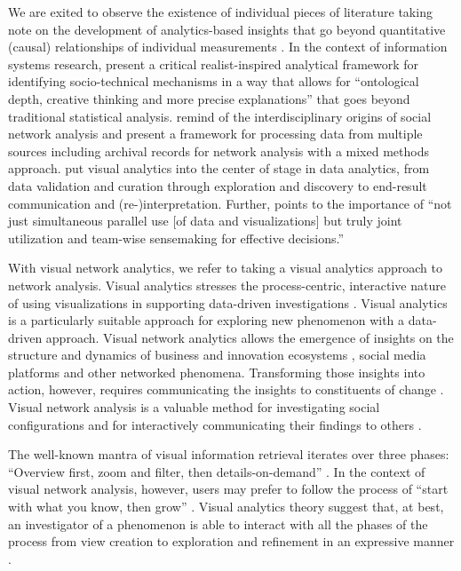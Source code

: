 We are exited to observe the existence of individual pieces of literature taking note on the development of analytics-based insights that go beyond quantitative (causal) relationships of individual measurements \citep{Bygstad2011InAnalysis,Bendoly2016FitAnalytics,Williams2015MixedAnalysis}. In the context of information systems research, \cite{Bygstad2011InAnalysis} present a critical realist-inspired analytical framework for identifying socio-technical mechanisms in a way that allows for ``ontological depth, creative thinking and more precise explanations'' that goes beyond traditional statistical analysis. \cite{Williams2015MixedAnalysis} remind of the interdisciplinary origins of social network analysis and present a framework for processing data from multiple sources including archival records for network analysis with a mixed methods approach. \cite{Bendoly2016FitAnalytics} put visual analytics into the center of stage in data analytics, from data validation and curation through exploration and discovery to end-result communication and (re-)interpretation. Further, \citeauthor{Bendoly2016FitAnalytics} points to the importance of ``not just simultaneous parallel use [of data and visualizations] but truly joint utilization and team-wise sensemaking for effective decisions.''

With visual network analytics, we refer to taking a visual analytics \citep{Thomas2006AAgenda,Heer2012InteractiveAnalysis} approach to network analysis. Visual analytics stresses the process-centric, interactive nature of using visualizations in supporting data-driven investigations \citep{Keim2010MasteringAnalytics,Heer2012InteractiveAnalysis}. Visual analytics is a particularly suitable approach for exploring new phenomenon with a data-driven approach. Visual network analytics allows the emergence of insights on the structure and dynamics of business and innovation ecosystems \citep{Basole2009VisualizationEcosystem}, social media platforms \citep{Smith2015TheConversations} and other networked phenomena. Transforming those insights into action, however, requires communicating the insights to constituents of change \citep{Russell2011TransformingOrchestration,Still2014InsightsVisualisations}. Visual network analysis is a valuable method for investigating social configurations and for interactively communicating their findings to others \citep{Freeman2000VisualizingNetworks}.

The well-known mantra of visual information retrieval iterates over three phases: ``Overview first, zoom and filter, then details-on-demand'' \citep{Shneiderman1996TheVisualizations}.
In the context of visual network analysis, however, users may prefer to follow the process of ``start with what you know, then grow'' 
\citep[][]{Heer2005Vizster:Networks}.
Visual analytics theory suggest that, at best, an investigator of a phenomenon is able to interact with all the phases of the process from view creation to exploration and refinement in an expressive manner \citep{Heer2012InteractiveAnalysis}.

